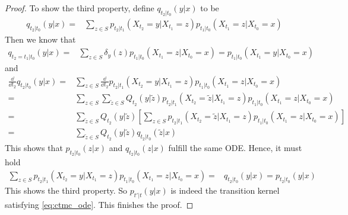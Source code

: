 \begin{proof}
To show the third property, define $q_{t_2|t_0}(y|x)$ to be 
\begin{align*}
q_{t_2|t_0}(y|x)=&\sum\limits_{z\in S}p_{t_{2}|t_{1}}(X_{t_2}=y|X_{t_1}=z)p_{t_1|t_0}(X_{t_1}=z|X_{t_0}=x)
\end{align*}
Then we know that 
\begin{align*}
    q_{t_2=t_1|t_0}(y|x)=&\sum\limits_{z\in S}\delta_{y}(z)p_{t_1|t_0}(X_{t_1}=z|X_{t_0}=x)=p_{t_1|t_0}(X_{t_1}=y|X_{t_0}=x)
\end{align*}
and
\begin{align*}
\frac{\dd}{\dd t_2}q_{t_2|t_0}(y|x)=&\sum\limits_{z\in S}\frac{\dd}{\dd t_2}p_{t_{2}|t_{1}}(X_{t_2}=y|X_{t_1}=z)p_{t_1|t_0}(X_{t_1}=z|X_{t_0}=x)\\
=&\sum\limits_{z\in S}\sum\limits_{\tilde{z}\in S}Q_{t_2}(y|\tilde{z})p_{t_2|t_1}(X_{t_2}=\tilde{z}|X_{t_1}=z)p_{t_1|t_0}(X_{t_1}=z|X_{t_0}=x)\\
=&\sum\limits_{\tilde{z}\in S}Q_{t_2}(y|\tilde{z})\left[\sum\limits_{z\in S}p_{t_2|t_1}(X_{t_2}=\tilde{z}|X_{t_1}=z)p_{t_1|t_0}(X_{t_1}=z|X_{t_0}=x)\right]\\
=&\sum\limits_{\tilde{z}\in S}Q_{t_2}(y|\tilde{z})q_{t_2|t_0}(\tilde{z}|x)
\end{align*}
This shows that $p_{t_2|t_0}(z|x)$ and $q_{t_2|t_0}(z|x)$ fulfill the same ODE. Hence, it must hold 
\begin{align*}
\sum\limits_{z\in S}p_{t_{2}|t_{1}}(X_{t_2}=y|X_{t_1}=z)p_{t_1|t_0}(X_{t_1}=z|X_{t_0}=x)=&q_{t_2|t_0}(y|x)=p_{t_2|t_0}(y|x)
\end{align*}
This shows the third property. So $p_{t'|t}(y|x)$ is indeed the transition kernel satisfying \cref{eq:ctmc_ode}. This finishes the proof.
\end{proof}
